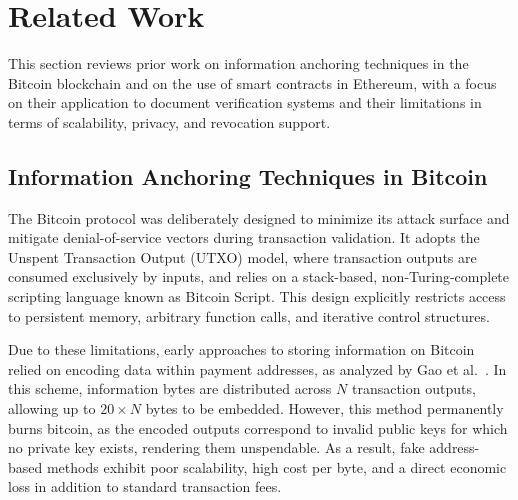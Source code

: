 \documentclass{ieeeaccess}
\begin{document}

\section{Related Work}
\label{sec.relatedwork}

This section reviews prior work on information anchoring techniques in the Bitcoin blockchain and on the use of smart contracts in Ethereum, with a focus on their application to document verification systems and their limitations in terms of scalability, privacy, and revocation support.

\subsection{Information Anchoring Techniques in Bitcoin}
\label{sec.methodsbitcoin}

The Bitcoin protocol was deliberately designed to minimize its attack surface and mitigate denial-of-service vectors during transaction validation.
It adopts the Unspent Transaction Output (UTXO) model, where transaction outputs are consumed exclusively by inputs, and relies on a stack-based, non-Turing-complete scripting language known as Bitcoin Script.
This design explicitly restricts access to persistent memory, arbitrary function calls, and iterative control structures.

Due to these limitations, early approaches to storing information on Bitcoin relied on encoding data within payment addresses, as analyzed by Gao et al.~\cite{Gao2017Decentralized}.
In this scheme, information bytes are distributed across $N$ transaction outputs, allowing up to $20 \times N$ bytes to be embedded.
However, this method permanently burns bitcoin, as the encoded outputs correspond to invalid public keys for which no private key exists, rendering them unspendable.
As a result, fake address-based methods exhibit poor scalability, high cost per byte, and a direct economic loss in addition to standard transaction fees.
\end{document}
